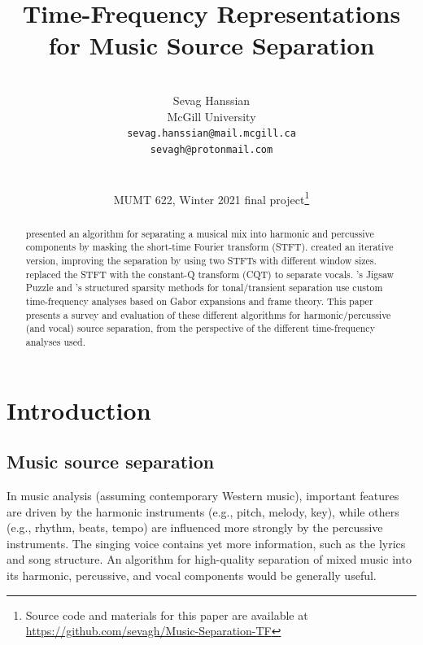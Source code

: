 \documentclass[letter,12pt]{article}
\title{Time-Frequency Representations for Music Source Separation}
\author{\vspace{2em}\\Sevag Hanssian \\
  McGill University \\
 \texttt{sevag.hanssian@mail.mcgill.ca} \\
 \texttt{sevagh@protonmail.com} \\\ \\\ \\
 MUMT 622, Winter 2021 final project\thanks{Source code and materials for this paper are available at \url{https://github.com/sevagh/Music-Separation-TF}}}
\date{}
\begin{document}
\maketitle

\vfill
\clearpage %

\tableofcontents

\vfill
\clearpage %

\listoffigures

\listoflistings

\vfill
\clearpage %



\begin{abstract}
	\citet{fitzgerald1} presented an algorithm for separating a musical mix into harmonic and percussive components by masking the short-time Fourier transform (STFT). \citet{driedger} created an iterative version, improving the separation by using two STFTs with different window sizes. \citet{fitzgerald2} replaced the STFT with the constant-Q transform (CQT) to separate vocals. \citet{tfjigsaw}'s Jigsaw Puzzle and \citet{wmdct}'s structured sparsity methods for tonal/transient separation use custom time-frequency analyses based on Gabor expansions and frame theory. This paper presents a survey and evaluation of these different algorithms for harmonic/percussive (and vocal) source separation, from the perspective of the different time-frequency analyses used.
\end{abstract}

\section{Introduction}
\label{sec:intro}

\subsection{Music source separation}

In music analysis (assuming contemporary Western music), important features are driven by the harmonic instruments (e.g., pitch, melody, key), while others (e.g., rhythm, beats, tempo) are influenced more strongly by the percussive instruments. The singing voice contains yet more information, such as the lyrics and song structure. An algorithm for high-quality separation of mixed music into its harmonic, percussive, and vocal components would be generally useful.
\end{document}
